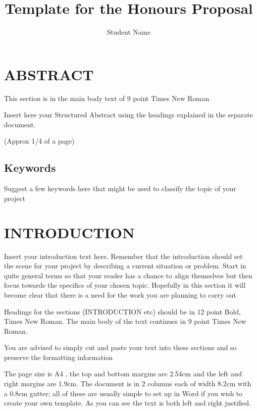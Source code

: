 \documentclass[9pt]{extarticle} %
\title{{\titleFont Template for the Honours Proposal}}
\author{Student Name}
\affil{School of Design and Informatics \\ Abertay University \\ DUNDEE, DD1 1HG, UK}
\date{} %
\begin{document}
\maketitle
 
\begin{multicols}{2}

\section*{ABSTRACT} %

This section is in the main body text of 9 point Times New Roman.

Insert here your Structured Abstract using the headings explained in the separate document.

(Approx 1/4 of a page)

\subsection*{Keywords}

Suggest a few keywords here that might be used to classify the topic of your project

\section{INTRODUCTION}

Insert your introduction text here. Remember that the introduction should set the scene for your project by describing a current situation or problem. Start in quite general terms so that your reader has a chance to align themselves but then focus towards the specifics of your chosen topic. Hopefully in this section it will become clear that there is a need for the work you are planning to carry out

Headings for the sections (INTRODUCTION etc) should be in 12 point Bold, Times New Roman. The main body of the text continues in 9 point Times New Roman.

You are advised to simply cut and paste your text into these sections and so preserve the formatting information

The page size is A4 , the top and bottom margins are 2.54cm and the left and right margins are 1.9cm. The document is in 2 columns each of width 8.2cm with a 0.8cm gutter; all of these are usually simple to set up in Word if you wish to create your own template. As you can see the text is both left and right justified.


\end{multicols}
\end{document}
